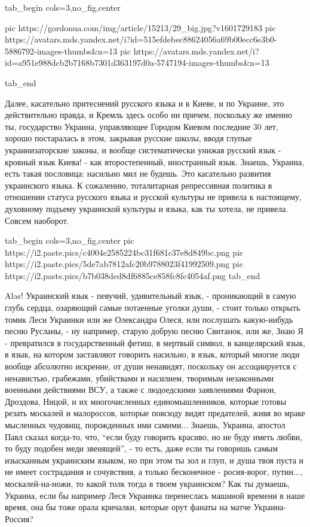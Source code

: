 \ifcmt
  tab_begin cols=3,no_fig,center

     pic https://gordonua.com/img/article/15213/29_big.jpg?v1601729183
     pic https://avatars.mds.yandex.net/i?id=515efdebec88624056a69b00ecc6e3b0-5886792-images-thumbs&n=13
     pic https://avatars.mds.yandex.net/i?id=a951e988dcb2b7168b7301d363197d0a-5747194-images-thumbs&n=13

  tab_end
\fi

Далее, касательно притеснений русского языка и в Киеве, и по Украине, это
действительно правда, и Кремль здесь особо ни причем, поскольку же именно ты,
государство Украина, управляющее Городом Киевом последние 30 лет, хорошо
постаралась в этом, закрывая русские школы, вводя глупые украинизаторские
законы, и вообще систематически унижая русский язык - кровный язык Киева! - как
второстепенный, иностранный язык.  Знаешь, Украина, есть такая пословица:
насильно мил не будешь. Это касательно развития украинского языка. К сожалению,
тоталитарная репрессивная политика в отношении статуса русского языка и русской
культуры не привела к настоящему, духовному подъему украинской культуры и
языка, как ты хотела, не привела. Совсем наоборот.

\ifcmt
  tab_begin cols=3,no_fig,center
     pic https://i2.paste.pics/c4004e2585224bc31f681c37e8d849bc.png
     pic https://i2.paste.pics/5de7ab7812afc20b9788023f41992509.png
     pic https://i2.paste.pics/b7b038ded8df6885ce858fc8fc4054af.png
  tab_end
\fi

Alas! Украинский язык - певучий, удивительный язык, - проникающий в самую глубь
сердца, озаряющий самые потаенные уголки души, - стоит только открыть томик
Леси Украинки или же Олександра Олеся, или послушать какую-нибудь песню
Русланы, - ну например, старую добрую песню Свитанок, или же, Знаю Я -
превратился в государственный фетиш, в мертвый символ, в канцелярский язык, в
язык, на котором заставляют говорить насильно, в язык, который многие люди
вообще абсолютно искренне, от души ненавидят, поскольку он ассоциируется с
ненавистью, грабежами, убийствами и насилием, творимым незаконными военными
действиями ВСУ, а также с людоедскими заявлениями Фарион, Дроздова, Ницой, и их
многочисленных единомышленников, которые готовы резать москалей и малороссов,
которые повсюду видят предателей, живя во мраке мысленных чудовищ, порожденных
ими самими... Знаешь, Украина, апостол Павл сказал когда-то, что, \enquote{если
буду говорить красиво, но не буду иметь любви, то буду подобен меди звенящей},
- то есть, даже если ты говоришь самым изысканным украинским языком, но при
этом ты зол и глуп, и душа твоя пуста и не имеет сострадания и сочувствия, а
только бесконечное - росия-ворог, путин..., москалей-на-ножи, то какой толк
тогда в твоем украинском? Как ты думаешь, Украина, если бы например Леся Украинка перенеслась
машиной времени в наше время, она бы тоже орала кричалки, которые орут фанаты
на матче Украина-Россия?

